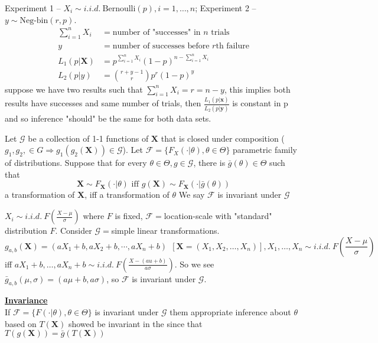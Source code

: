 \documentclass[english, 11pt]{article}
\begin{document}
\begin{exmp}
Experiment 1 -- $X_i\sim i.i.d.~ \text{Bernoulli}(p), i=1, \dots, n$; Experiment 2 -- $y\sim\text{Neg-bin}(r, p)$.
$$
\begin{aligned}
\sum_{i=1}^nX_i&=\text{number of "successes" in $n$ trials}\\
y&=\text{number of successes before $r$th failure}\\
L_1(p|\bm{X})&=p^{\sum_{i=1}^nX_i}(1-p)^{n-\sum_{i=1}^nX_i}\\
L_2(p|y)&=\binom{r+y-1}{r}p^r(1-p)^{y}
\end{aligned}
$$
suppose we have two results such that $\sum_{i=1}^nX_i=r=n-y$, this implies both results have successes and same number of trials, then $\frac{L_1(p|\bm{x})}{L_2(p|\bm{y})}$ is constant in p and so inference "should" be the same for both data sets.
\end{exmp}

\begin{defn}\label{defn:228}
Let $\mathscr{G}$ be a collection of 1-1 functions of $\bm{X}$ that  is closed under composition ($g_1, g_2, \in G\Rightarrow g_1(g_2(\bm{X}))\in \mathscr{G}$). Let $\mathscr{F}=\{F_X(\cdot|\theta), \theta\in \Theta\}$ parametric family of distributions. Suppose that for every $\theta\in \Theta, g\in\mathscr{G}$, there is $\bar{g}(\theta)\in \Theta$ such that
$$
\bm{X}\sim F_{\bm{X}}(\cdot|\theta)\text{ iff } g(\bm{X})\sim F_{\bm{X}}(\cdot|\bar{g}(\theta))
$$
a transformation of $\bm{X}$, iff a transformation of $\theta$ We say $\mathscr{F}$ is invariant under $\mathscr{G}$
\end{defn}

\begin{exmp}
$X_i\sim i.i.d.~F\left(\frac{X-\mu}{\sigma}\right)$ where $F$ is fixed, $\mathscr{F}=$location-scale with "standard" distribution $F$. Consider $\mathscr{G}=$simple linear transformations. 
$$
g_{a,b}(\bm{X})=(aX_1+b, aX_2+b, \cdots, aX_n+b)\ \ [\bm{X}=(X_1, X_2, \dots, X_n)], X_1, \dots, X_n\sim i.i.d.~F\left(\frac{X-\mu}{\sigma}\right)
$$
iff $aX_1+b, \dots, aX_n+b\sim i.i.d.~F\left(\frac{X-(au+b)}{a\sigma}\right)$. So we see $\bar{g}_{a, b}(\mu,\sigma)=(a\mu+b, a\sigma)$, so $\mathscr{F}$ is invariant under $\mathscr{G}$.
\end{exmp}

\underline{\textbf{Invariance}}\\
If $\mathscr{F}=\{F(\cdot|\theta), \theta\in\Theta\}$ is invariant under $\mathscr{G}$ them appropriate inference about $\theta$ based on $T(\bm{X})$ showed be invariant in the since that $T(g(\bm{X}))=\bar{g}(T(\bm{X}))$
\end{document}
